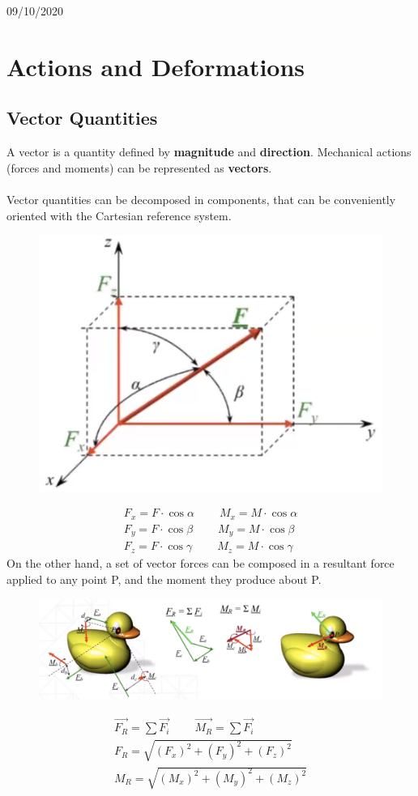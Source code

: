 \documentclass[class=report, crop=false, 12pt,a4paper]{standalone}
\begin{document}
\begin{center}
    09/10/2020
\end{center}
\section{Actions and Deformations}
\subsection{Vector Quantities}
A vector is a quantity defined by \textbf{magnitude} and \textbf{direction}. Mechanical actions (forces and moments) can be represented as \textbf{vectors}. \\\\
Vector quantities can be decomposed in components, that can be conveniently oriented with the Cartesian reference system.
\begin{figure}[H]
  \centering
  \includegraphics[width = 0.5 \textwidth]{../img/vectordecomposition.PNG}
\end{figure}
\begin{gather}
  F_x = F \cdot \cos \alpha \ \ \ \ \ \ \ \ \ \ M_x = M \cdot \cos \alpha \\
  F_y = F \cdot \cos \beta \ \ \ \ \ \ \ \ \ \ M_y = M \cdot \cos \beta \\
  F_z = F \cdot \cos \gamma \ \ \ \ \ \ \ \ \ \ M_z = M \cdot \cos \gamma
\end{gather}
On the other hand, a set of vector forces can be composed in a resultant force applied to any point P, and the moment they produce about P. 
\begin{figure}[H]
  \centering
  \includegraphics[width = 1 \textwidth]{../img/forcesandmoments.PNG}
\end{figure}
\begin{gather}
  \vec{F_R} = \sum \vec{F_i} \ \ \ \ \ \ \ \ \ \ \vec{M_R} = \sum \vec{F_i} \\
  F_R = \sqrt{(F_x)^2 + (F_y)^2 + (F_z)^2} \\
  M_R = \sqrt{(M_x)^2 + (M_y)^2 + (M_z)^2}
\end{gather}
\end{document}
